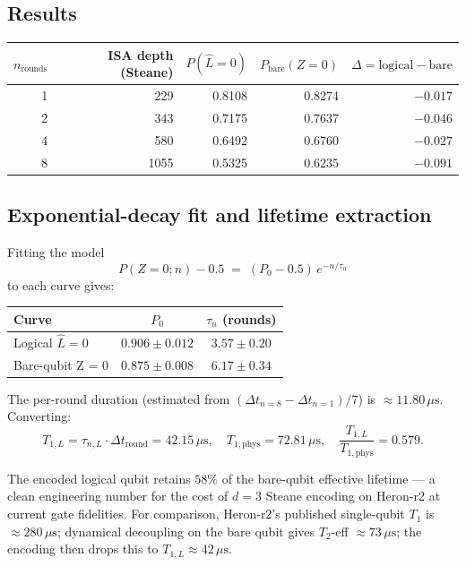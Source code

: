 \documentclass[11pt,letterpaper]{article}
\begin{document}
\subsection{Results}

\begin{center}
\begin{tabular}{rrrrr}
\toprule
$n_{\mathrm{rounds}}$ & ISA depth (Steane) & $P(\hat L = 0)$ & $P_{\mathrm{bare}}(Z = 0)$ & $\Delta = \mathrm{logical} - \mathrm{bare}$ \\
\midrule
1 & 229  & 0.8108 & 0.8274 & $-0.017$ \\
2 & 343  & 0.7175 & 0.7637 & $-0.046$ \\
4 & 580  & 0.6492 & 0.6760 & $-0.027$ \\
8 & 1055 & 0.5325 & 0.6235 & $-0.091$ \\
\bottomrule
\end{tabular}
\end{center}

\subsection{Exponential-decay fit and lifetime extraction}

Fitting the model
\[
P(Z = 0; n) - 0.5 \;=\; (P_0 - 0.5)\, e^{-n / \tau_n}
\]
to each curve gives:

\begin{center}
\begin{tabular}{lcc}
\toprule
Curve & $P_0$ & $\tau_n$ (rounds) \\
\midrule
Logical $\hat L = 0$ & $0.906 \pm 0.012$ & $3.57 \pm 0.20$ \\
Bare-qubit Z = 0 & $0.875 \pm 0.008$ & $6.17 \pm 0.34$ \\
\bottomrule
\end{tabular}
\end{center}

The per-round duration (estimated from $(\Delta t_{n=8} - \Delta t_{n=1})/7$) is $\approx 11.80\,\mu\mathrm{s}$. Converting:
\[
\boxed{T_{1,L} = \tau_{n,L} \cdot \Delta t_{\mathrm{round}} = 42.15\,\mu\mathrm{s}, \quad T_{1,\mathrm{phys}} = 72.81\,\mu\mathrm{s}, \quad \frac{T_{1,L}}{T_{1,\mathrm{phys}}} = 0.579.}
\]

The encoded logical qubit retains $58\%$ of the bare-qubit effective lifetime --- a clean engineering number for the cost of $d = 3$ Steane encoding on Heron-r2 at current gate fidelities. For comparison, Heron-r2's published single-qubit $T_1$ is $\approx 280\,\mu\mathrm{s}$; dynamical decoupling on the bare qubit gives $T_2$-eff $\approx 73\,\mu\mathrm{s}$; the encoding then drops this to $T_{1,L} \approx 42\,\mu\mathrm{s}$.
\end{document}
